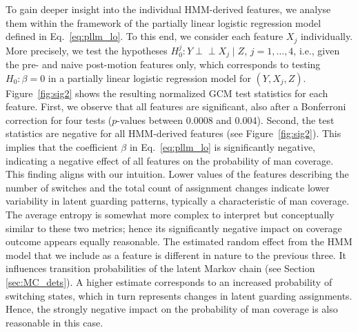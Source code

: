 \documentclass[namedate,webpdf,modern,medium]{oup-authoring-template}
\begin{document}
To gain deeper insight into the individual HMM-derived features, we analyse them within the framework of the partially linear logistic regression model defined in Eq.~\ref{eq:pllm_lo}. To this end, we consider each feature $X_j$ individually. More precisely, we test the hypotheses $H_0^j: Y \perp\!\!\!\perp X_j \mid Z$, $j = 1,\dots,4$, i.e., given the pre- and naive post-motion features only, which corresponds to testing $H_0: \beta = 0$ in a partially linear logistic regression model for $(Y,X_j,Z)$. Figure~\ref{fig:sig2} shows the resulting normalized GCM test statistics for each feature. First, we observe that all features are significant, also after a Bonferroni correction for four tests ($p$-values between 0.0008 and 0.004). Second, the test statistics are negative for all HMM-derived features (see Figure~\ref{fig:sig2}). This implies that the coefficient $\beta$ in Eq.~\ref{eq:pllm_lo} is significantly negative, indicating a negative effect of all features on the probability of man coverage. This finding aligns with our intuition. Lower values of the features describing the number of switches and the total count of assignment changes indicate lower variability in latent guarding patterns, typically a characteristic of man coverage. The average entropy is somewhat more complex to interpret but conceptually similar to these two metrics; hence its significantly negative impact on coverage outcome appears equally reasonable. The estimated random effect from the HMM model that we include as a feature is different in nature to the previous three. It influences transition probabilities of the latent Markov chain (see Section \ref{sec:MC_dets}). A higher estimate corresponds to an increased probability of switching states, which in turn represents changes in latent guarding assignments. Hence, the strongly negative impact on the probability of man coverage is also reasonable in this case.

\end{document}
